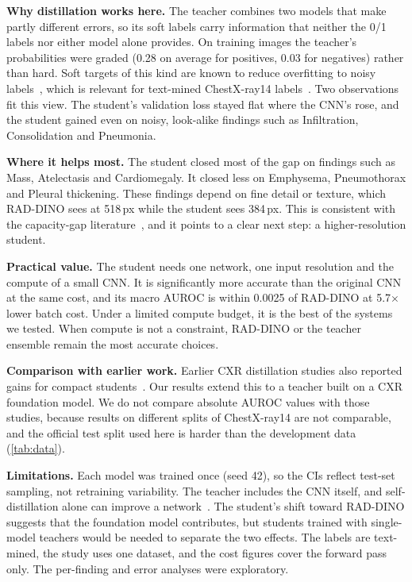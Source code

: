 \documentclass[conference]{IEEEtran}
\begin{document}
\textbf{Why distillation works here.} The teacher combines two models that make partly different errors, so its soft labels carry information that neither the 0/1 labels nor either model alone provides. On training images the teacher's probabilities were graded (0.28 on average for positives, 0.03 for negatives) rather than hard. Soft targets of this kind are known to reduce overfitting to noisy labels~\cite{li2017noisy}, which is relevant for text-mined ChestX-ray14 labels~\cite{oakdenrayner2020exploring}. Two observations fit this view. The student's validation loss stayed flat where the CNN's rose, and the student gained even on noisy, look-alike findings such as Infiltration, Consolidation and Pneumonia.

\textbf{Where it helps most.} The student closed most of the gap on findings such as Mass, Atelectasis and Cardiomegaly. It closed less on Emphysema, Pneumothorax and Pleural thickening. These findings depend on fine detail or texture, which RAD-DINO sees at 518\,px while the student sees 384\,px. This is consistent with the capacity-gap literature~\cite{cho2019efficacy,mirzadeh2020teacher}, and it points to a clear next step: a higher-resolution student.

\textbf{Practical value.} The student needs one network, one input resolution and the compute of a small CNN. It is significantly more accurate than the original CNN at the same cost, and its macro AUROC is within 0.0025 of RAD-DINO at 5.7$\times$ lower batch cost. Under a limited compute budget, it is the best of the systems we tested. When compute is not a constraint, RAD-DINO or the teacher ensemble remain the most accurate choices.

\textbf{Comparison with earlier work.} Earlier CXR distillation studies also reported gains for compact students~\cite{ho2020utilizing,termritthikun2024explainable,kishore2025enhancing}. Our results extend this to a teacher built on a CXR foundation model. We do not compare absolute AUROC values with those studies, because results on different splits of ChestX-ray14 are not comparable, and the official test split used here is harder than the development data (\cref{tab:data}).

\textbf{Limitations.} Each model was trained once (seed 42), so the CIs reflect test-set sampling, not retraining variability. The teacher includes the CNN itself, and self-distillation alone can improve a network~\cite{furlanello2018born}. The student's shift toward RAD-DINO suggests that the foundation model contributes, but students trained with single-model teachers would be needed to separate the two effects. The labels are text-mined, the study uses one dataset, and the cost figures cover the forward pass only. The per-finding and error analyses were exploratory.
\end{document}
